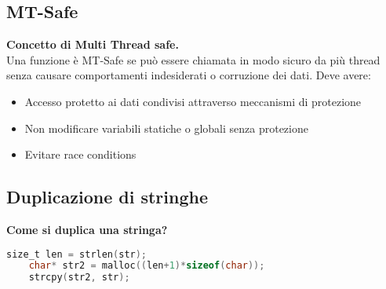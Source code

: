 \subsection{MT-Safe}
\textbf{Concetto di Multi Thread safe.}\\
Una funzione è MT-Safe se può essere chiamata in modo sicuro da più thread senza causare comportamenti indesiderati o corruzione dei dati. Deve avere:
\begin{itemize}
	\item Accesso protetto ai dati condivisi attraverso meccanismi di protezione
	\item Non modificare variabili statiche o globali senza protezione
	\item Evitare race conditions
\end{itemize}

\subsection{Duplicazione di stringhe}
\textbf{Come si duplica una stringa?}\\
\begin{lstlisting}[language=C]
	size_t len = strlen(str);
	char* str2 = malloc((len+1)*sizeof(char));
	strcpy(str2, str);
\end{lstlisting}